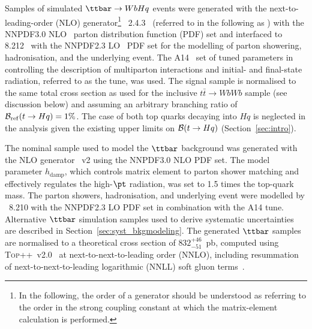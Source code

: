 Samples of simulated $\ttbar \to WbHq$ events were generated with the next-to-leading-order (NLO) generator\footnote{In the following, 
the order of a generator should be understood as referring to the order in the strong coupling constant at which the matrix-element calculation 
is performed.} {\amcatnlolong}~2.4.3~\cite{Alwall:2014hca}  (referred to in the following as {\amcatnlo}) with the NNPDF3.0 NLO~\cite{Ball:2014uwa} parton distribution function (PDF) set and interfaced to {\pythia} 8.212~\cite{Sjostrand:2007gs} with the NNPDF2.3 LO~\cite{Ball:2012cx} PDF set for the modelling of parton showering, hadronisation, and the underlying event. 
The A14~\cite{ATLASUETune4} set of tuned parameters in {\pythia} controlling the description of multiparton interactions and  
initial- and final-state radiation, referred to as the tune, was used.
The signal sample is normalised to the same total cross section as used for the inclusive $t\bar{t}\to WbWb$ sample (see discussion below) and
assuming an arbitrary branching ratio of $\mathcal{B}_{\mathrm{ref}}(t\to Hq)=1\%$.
The case of both top quarks decaying into $Hq$ is neglected in the analysis given the existing upper limits on $\mathcal{B}(t \to Hq)$ (Section~\ref{sec:intro}).

The nominal sample used to model the $\ttbar$ background was generated with the NLO generator {\powheg}~v2 \cite{Frixione:2007nw,Nason:2004rx,Frixione:2007vw,Alioli:2010xd} using the NNPDF3.0 NLO PDF set. The {\powheg} model parameter $h_{\textrm{damp}}$, which controls 
matrix element to parton shower matching and effectively regulates the high-$\pt$ radiation, was set to 1.5 times the top-quark mass. 
The parton showers, hadronisation, and underlying event were modelled by {\pythia}~8.210 with the NNPDF2.3 LO PDF set in combination with the A14 tune.
Alternative $\ttbar$ simulation samples used to derive systematic uncertainties are described in Section~\ref{sec:syst_bkgmodeling}. 
The generated $\ttbar$ samples are normalised to a theoretical cross section of $832^{+46}_{-51}$~pb, 
computed using \textsc{Top++}~v2.0~\cite{Czakon:2011xx} at next-to-next-to-leading order (NNLO), 
including resummation of next-to-next-to-leading logarithmic (NNLL) soft gluon 
terms~\cite{Cacciari:2011hy,Baernreuther:2012ws,Czakon:2012zr,Czakon:2012pz,Czakon:2013goa}.

